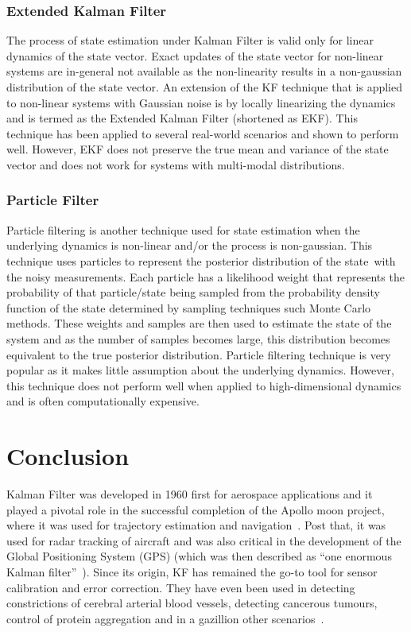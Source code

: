 \documentclass{resonance}
\begin{document}
\subsubsection*{Extended Kalman Filter}
The process of state estimation under Kalman Filter is valid only for linear dynamics of the state vector.  Exact updates of the state vector for non-linear systems are in-general not available as the non-linearity results in a non-gaussian distribution of the state vector. An extension of the KF technique that is applied to non-linear systems with Gaussian noise is by locally linearizing the dynamics and is termed as the Extended Kalman Filter (shortened as EKF). This technique has been applied to several real-world scenarios and shown to perform well. However, EKF does not preserve the true mean and variance of the state vector and does not work for systems with multi-modal distributions.

\subsubsection*{Particle Filter}
Particle filtering is another technique used for state estimation when the underlying dynamics is non-linear and/or the process is non-gaussian. This technique uses particles to represent the posterior distribution of the state with the noisy measurements. Each particle has a likelihood weight that represents the probability of that particle/state being sampled from the probability density function of the state determined by sampling techniques such Monte Carlo methods. These weights and samples are then used to estimate the state of the system and as the number of samples becomes large, this distribution becomes equivalent to the true posterior distribution. Particle filtering technique is very popular as it makes little assumption about the underlying dynamics. However, this technique does not perform well when applied to high-dimensional dynamics and is often computationally expensive.

\section{Conclusion}
Kalman Filter was developed in 1960 first for aerospace applications and it played a pivotal role in the successful completion of the Apollo moon project, where it was used for trajectory estimation and navigation~\cite{grewal2010applications}. Post that, it was used for radar tracking of aircraft and was also critical in the development of the Global Positioning System (GPS) (which was then described as ``one enormous Kalman filter''~\cite{grewal2010applications}). Since its origin, KF has remained the go-to tool for sensor calibration and error correction. They have even been used in detecting constrictions of cerebral arterial blood vessels, detecting cancerous tumours, control of protein aggregation and in a gazillion other scenarios~\cite{grewal2010applications,fernandez2009extended,moreno2009kalman}.
\end{document}
